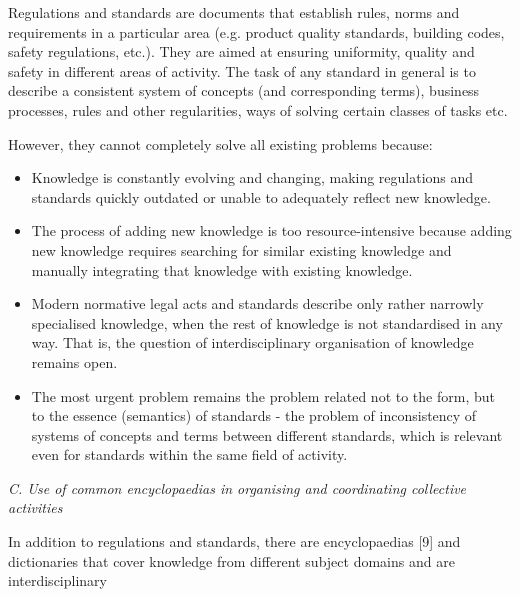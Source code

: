 \documentclass[a4paper]{article}
\begin{document}
\begin{multicols}{2}
{\fontsize{9.5}{13}\selectfont Regulations and standards are documents that establish rules, norms and requirements in a particular area
(e.g. product quality standards, building codes, safety
regulations, etc.). They are aimed at ensuring uniformity,
quality and safety in different areas of activity. The task
of any standard in general is to describe a consistent
system of concepts (and corresponding terms), business
processes, rules and other regularities, ways of solving
certain classes of tasks etc.
}

{\fontsize{9.5}{13}\selectfont However, they cannot completely solve all existing
problems because:
}

\begin{itemize}[leftmargin=5mm]
        
        \item Knowledge is constantly evolving and changing,
making regulations and standards quickly outdated
or unable to adequately reflect new knowledge.
        \item The process of adding new knowledge is too
resource-intensive because adding new knowledge
requires searching for similar existing knowledge
and manually integrating that knowledge with existing knowledge.
        \item Modern normative legal acts and standards describe
only rather narrowly specialised knowledge, when
the rest of knowledge is not standardised in any way.
That is, the question of interdisciplinary organisation of knowledge remains open.
        \item The most urgent problem remains the problem related not to the form, but to the essence (semantics)
of standards - the problem of inconsistency of systems of concepts and terms between different standards, which is relevant even for standards within
the same field of activity.
    
\end{itemize}

\vspace{0.7mm}

{\setlength{\parindent}{0pt}\nohyphens{\textit{C. Use of common encyclopaedias in organising and
coordinating collective activities
}}} \par

\vspace{0.1mm}

{\fontsize{9.5}{13}\selectfont In addition to regulations and standards, there are
encyclopaedias [9] and dictionaries that cover knowledge
from different subject domains and are interdisciplinary
}


\end{multicols}
\end{document}
